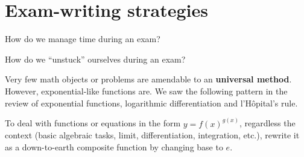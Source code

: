 \documentclass[../main.tex]{subfiles}
\begin{document}
 \section{Exam-writing strategies}
  \faComment{} How do we manage time during an exam?
  \clearpage

  \faComment{} How do we ``unstuck'' ourselves during an exam?
  \clearpage


  \clearpage
  Very few math objects or problems are amendable to an \textbf{universal method}. However, exponential-like functions are. We saw the following pattern in the review of exponential functions, logarithmic differentiation and l'H\^opital's rule.

  To deal with functions or equations in the form \(y = f(x)^{g(x)}\), regardless the context (basic algebraic tasks, limit, differentiation, integration, etc.), rewrite it as a down-to-earth composite function by changing base to \(e\).
\end{document}
